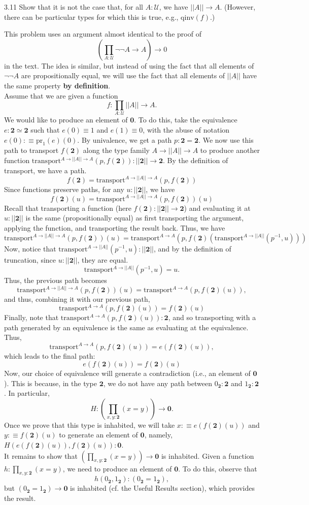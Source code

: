 \documentclass[14pt]{extarticle}
\newcommand{\0}{{\mathbf 0}}
\newcommand{\1}{{\mathbf 1}}
\newcommand{\2}{{\mathbf 2}}
\newcommand{\UU}{{\mathcal U}}
\newcommand{\pr}{\mathrm{pr}}
\newcommand{\tr}{\mathrm{transport}}
\newcommand{\qinv}{\mathrm{qinv}}
\begin{document}
\begin{prob}{3.11}{}
Show that it is not the case that, for all $A : \UU$, we have $||A|| \to A$. (However, there can be particular types for which this is true, e.g., $\qinv(f)$.)
\end{prob}
This problem uses an argument almost identical to the proof of \[\left(\prod_{A : \UU} \neg \neg A \to A \right) \to 0\] in the text. The idea is similar, but instead of using the fact that all elements of $\neg \neg A$ are propositionally equal, we will use the fact that all elements of $||A||$ have the same property \textbf{by definition}.\\
Assume that we are given a function \[f : \prod_{A:\UU} ||A|| \to A.\] We would like to produce an element of $\0$. To do this, take the equivalence $e : \2 \simeq \2$ such that $e(0) \equiv 1$ and $e(1) \equiv 0$, with the abuse of notation $e(0) :\equiv \pr_1(e)(0)$. By univalence, we get a path $p : \2 = \2$. We now use this path to transport $f(\2)$ along the type family $A \to ||A|| \to A$ to produce another function $\tr^{A \to ||A|| \to A}(p,f(\2)) : ||\2|| \to \2$. By the definition of transport, we have a path.
\[f(\2) = \tr^{A \to ||A|| \to A}(p,f(\2))\]
Since functions preserve paths, for any $u : ||\2||$, we have
\[f(\2)(u) = \tr^{A \to ||A|| \to A}(p,f(\2))(u)\]
Recall that transporting a function (here $f(\2) : ||\2|| \to \2$) and evaluating it at $u : ||\2||$ is the same (propositionally equal) as first transporting the argument, applying the function, and transporting the result back. Thus, we have
\[\tr^{A \to ||A|| \to A}(p,f(\2))(u) = \tr^{A \to A}(p,f(\2)(\tr^{A \to ||A||}(p^{-1}, u)))\]
Now, notice that $\tr^{A \to ||A||}(p^{-1}, u) : ||\2||$, and by the definition of truncation, since $u : ||\2||$, they are equal.
\[\tr^{A \to ||A||}(p^{-1}, u) = u.\] Thus, the previous path becomes
\[\tr^{A \to ||A|| \to A}(p,f(\2))(u) = \tr^{A \to A}(p,f(\2)(u)),\] and thus, combining it with our previous path,
\[\tr^{A \to A}(p,f(\2)(u)) = f(\2)(u)\]
Finally, note that $\tr^{A \to A}(p,f(\2)(u)) : \2$, and so transporting with a path generated by an equivalence is the same as evaluating at the equivalence. Thus,
\[\tr^{A \to A}(p,f(\2)(u)) = e(f(\2)(u)),\] which leads to the final path:
\[e(f(\2)(u)) = f(\2)(u)\]
Now, our choice of equivalence will generate a contradiction (i.e., an element of $\0$). This is because, in the type $\2$, we do not have any path between $0_\2 : \2$ and $1_\2 : \2$. In particular,
\[H : \left(\prod_{x,y:\2} (x=y) \right) \to \0.\] Once we prove that this type is inhabited, we will take $x :\equiv e(f(\2)(u))$ and $y : \equiv f(\2)(u)$ to generate an element of $\0$, namely, $H(e(f(\2)(u)),f(\2)(u)) : \0$.\\
It remains to show that $\left(\prod_{x,y:\2} (x=y) \right) \to \0$ is inhabited. Given a function $h : \prod_{x,y:\2} (x=y)$, we need to produce an element of $\0$. To do this, observe that
\[h(0_\2, 1_\2) : (0_\2 = 1_\2),\] but $(0_\2 = 1_\2) \to \0$ is inhabited (cf. the Useful Results section), which provides the result.\\
\end{document}

